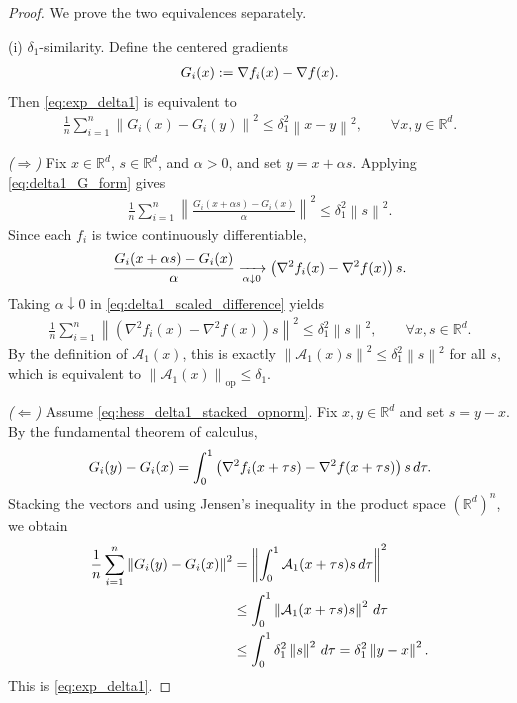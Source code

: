 \documentclass[10pt,a4paper]{amsart}
\newcommand{\R}{\bb R}
\newcommand{\bb}{\mathbb}
\newcommand{\eqdef}{:=}
\newcommand{\op}{\operatorname{op}}
\newcommand{\opnorm}[1]{\left\| #1 \right\|_{\op}}      %
\providecommand{\paragraph}{}
\newcommand{\rb}[1]{\left(#1\right)}
\newcommand{\sqn}[1]{\left\| #1 \right\|^2}
\begin{document}
\begin{proof}
We prove the two equivalences separately.

\paragraph{(i) $\delta_1$-similarity.}
Define the centered gradients
\begin{align}
    G_i(x)\eqdef \nabla f_i(x)-\nabla f(x).
    \notag
\end{align}
Then \eqref{eq:exp_delta1} is equivalent to
\begin{align}
    \frac1n\sum_{i=1}^n
    \sqn{G_i(x)-G_i(y)}
    \le
    \delta_1^2\sqn{x-y},
    \qquad
    \forall x,y\in\R^d .
    \label{eq:delta1_G_form}
\end{align}

\smallskip
\noindent
\emph{($\Rightarrow$)}
Fix $x\in\R^d$, $s\in\R^d$, and $\alpha>0$, and set
$y=x+\alpha s$. Applying \eqref{eq:delta1_G_form} gives
\begin{align}
    \frac1n\sum_{i=1}^n
    \sqn{
    \frac{G_i(x+\alpha s)-G_i(x)}{\alpha}}
    \le
    \delta_1^2\sqn{s}.
    \label{eq:delta1_scaled_difference}
\end{align}
Since each $f_i$ is twice continuously differentiable,
\begin{align}
    \frac{G_i(x+\alpha s)-G_i(x)}{\alpha}
    \xrightarrow[\alpha\downarrow 0]{}
    \rb{\nabla^2 f_i(x)-\nabla^2 f(x)}s .
    \notag
\end{align}
Taking $\alpha\downarrow 0$ in \eqref{eq:delta1_scaled_difference} yields
\begin{align}
    \frac1n\sum_{i=1}^n
    \sqn{
    \rb{\nabla^2 f_i(x)-\nabla^2 f(x)}s}
    \le
    \delta_1^2\sqn{s},
    \qquad
    \forall x,s\in\R^d .
    \label{eq:delta1_directional_hessian}
\end{align}
By the definition of $\mathcal{A}_1(x)$, this is exactly
$\sqn{\mathcal{A}_1(x)s}\le \delta_1^2\sqn{s}$ for all $s$,
which is equivalent to $\opnorm{\mathcal{A}_1(x)}\le \delta_1$.

\smallskip
\noindent
\emph{($\Leftarrow$)}
Assume \eqref{eq:hess_delta1_stacked_opnorm}. Fix $x,y\in\R^d$
and set $s=y-x$. By the fundamental theorem of calculus,
\begin{align}
    G_i(y)-G_i(x)
    =
    \int_0^1
    \rb{\nabla^2 f_i(x+\tau s)-\nabla^2 f(x+\tau s)}s
    \,d\tau .
    \notag
\end{align}
Stacking the vectors and using Jensen's inequality in the product space
$(\R^d)^n$, we obtain
\begin{align}
    \frac1n\sum_{i=1}^n \sqn{G_i(y)-G_i(x)}
    &=
    \sqn{
    \int_0^1
    \mathcal{A}_1(x+\tau s)s
    \,d\tau}
    \notag
    \\
    &\le
    \int_0^1
    \sqn{\mathcal{A}_1(x+\tau s)s}
    \,d\tau
    \notag
    \\
    &\le
    \int_0^1
    \delta_1^2\sqn{s}
    \,d\tau
    =
    \delta_1^2\sqn{y-x}.
    \notag
\end{align}
This is \eqref{eq:exp_delta1}.


\end{proof}
\end{document}
